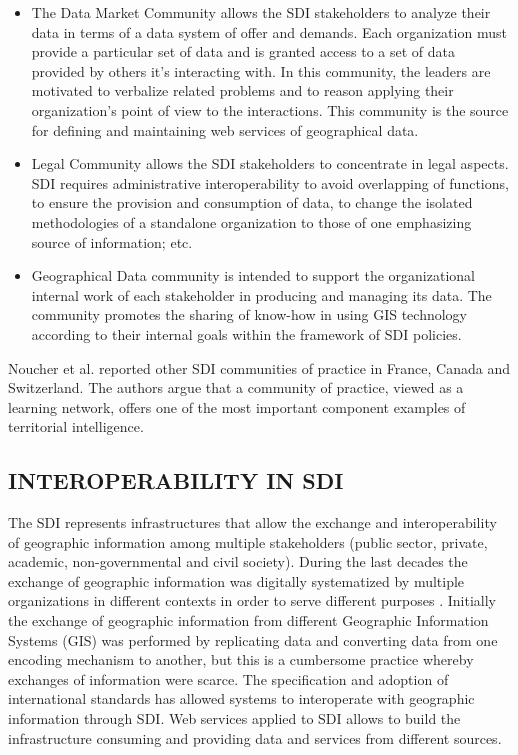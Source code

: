 \documentclass[10pt,twocolumn,ieeetran]{article}
\begin{document}
\begin{itemize}
\item The Data Market Community allows the SDI stakeholders to analyze their data in terms of a data system of offer and demands. Each organization must provide a particular set of data and is granted access to a set of data provided by others it's interacting with. In this community, the leaders are motivated to verbalize related problems and to reason applying their organization's point of view to the interactions. This community is the source for defining and maintaining web services of geographical data.
 
\item Legal Community allows the SDI stakeholders to concentrate in legal aspects. SDI requires administrative interoperability to avoid overlapping of functions, to ensure the provision and consumption of data, to change the isolated methodologies of a standalone organization to those of one emphasizing source of information; etc.
\item Geographical Data  community is intended to support the organizational internal work of each stakeholder in producing and managing its data. The community promotes the sharing of know-how in using GIS technology according to their internal goals within the framework of SDI policies.
\end{itemize}

Noucher et al. \cite{Noucher2} reported other SDI communities of practice in France, Canada and Switzerland.
The authors \cite{Noucher1} argue that a community of practice, viewed as a learning network, offers one of the most important component examples of territorial intelligence.

\subsection{INTEROPERABILITY IN SDI}

The SDI represents infrastructures that allow the exchange and interoperability of geographic information among multiple stakeholders (public sector, private, academic, non-governmental and civil society). During the last decades the exchange of geographic information was digitally systematized by multiple organizations in different contexts in order to serve different purposes \cite{Delgado} \cite{Georgiadou}.
Initially the exchange of geographic information from different Geographic Information Systems (GIS) was performed by replicating data and converting data from one encoding mechanism to another, but this is a cumbersome practice whereby exchanges of information were scarce. The specification and adoption of international standards has allowed systems to interoperate with geographic information through SDI.
Web services applied to SDI allows to build the infrastructure consuming and providing data and services from different sources.
\end{document}
